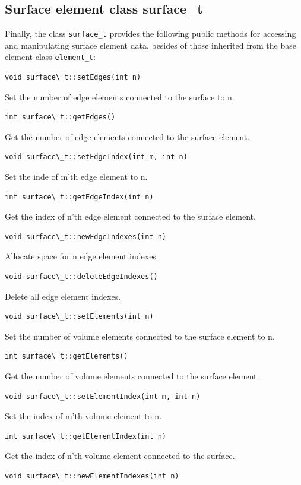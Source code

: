 \documentclass[a4paper,12pt]{article}
\begin{document}
\subsection{Surface element class surface\_t}

Finally, the class {\tt surface\_t} provides the following public methods for
accessing and manipulating surface element data, besides of those inherited
from the base element class {\tt element\_t}:

\begin{verbatim}
void surface\_t::setEdges(int n)
\end{verbatim}
Set the number of edge elements connected to the surface to n.
\begin{verbatim}
int surface\_t::getEdges()
\end{verbatim}
Get the number of edge elements connected to the surface element.
\begin{verbatim}
void surface\_t::setEdgeIndex(int m, int n)
\end{verbatim}
Set the inde of m'th edge element to n.
\begin{verbatim}
int surface\_t::getEdgeIndex(int n)
\end{verbatim}
Get the index of n'th edge element connected to the surface element.
\begin{verbatim}
void surface\_t::newEdgeIndexes(int n)
\end{verbatim}
Allocate space for n edge element indexes.
\begin{verbatim}
void surface\_t::deleteEdgeIndexes()
\end{verbatim}
Delete all edge element indexes.
\begin{verbatim}
void surface\_t::setElements(int n)
\end{verbatim}
Set the number of volume elements connected to the surface element to n.
\begin{verbatim}
int surface\_t::getElements()
\end{verbatim}
Get the number of volume elements connected to the surface element.
\begin{verbatim}
void surface\_t::setElementIndex(int m, int n)
\end{verbatim}
Set the index of m'th volume element to n.
\begin{verbatim}
int surface\_t::getElementIndex(int n)
\end{verbatim}
Get the index of n'th volume element connected to the surface.
\begin{verbatim}
void surface\_t::newElementIndexes(int n)
\end{verbatim}
\end{document}
